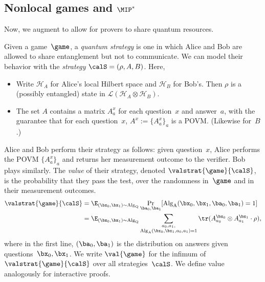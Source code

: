 \subsection{Nonlocal games and $\MIP^*$}

Now, we augment 
to allow for provers to share quantum resources.

\begin{definition}
Given a game~$\game$, a \emph{quantum strategy}
is one in which Alice and Bob are allowed to share entanglement but not to communicate.
We can model their behavior with the \emph{strategy} $\calS= (\rho, A, B)$.
Here,
\begin{itemize}
\itemsep -.5pt
\item[$\circ$] Write $\mathcal{H}_A$ for Alice's local Hilbert space and $\mathcal{H}_B$ for Bob's.
		Then $\rho$ is a (possibly entangled) state in $\mathcal{L}(\mathcal{H}_A \otimes \mathcal{H}_B)$.
\item[$\circ$] The set $A$ contains a matrix $A_a^x$ for each question~$x$ and answer~$a$,
		with the guarantee that for each question~$x$, $A^x := \{A_a^x\}_a$ is a POVM. (Likewise for~$B$.)
\end{itemize} 
Alice and Bob perform their strategy as follows:
given question~$x$, Alice performs the POVM $\{A_a^x\}_a$ and returns her measurement outcome to the verifier.
Bob plays similarly.
The \emph{value} of their strategy, denoted $\valstrat{\game}{\calS}$, is the probability that they pass the test,
over the randomness in~$\game$ and in their measurement outcomes.
\begin{align*}
\valstrat{\game}{\calS}
&= \E_{(\bx_0, \bx_1) \sim \mathrm{Alg}_{\mathrm{Q}}} \Pr_{\ba_0, \ba_1}[\mathrm{Alg}_{\mathrm{A}}(\bx_0, \bx_1, \ba_0, \ba_1) = 1]\\
&= \E_{(\bx_0, \bx_1) \sim \mathrm{Alg}_{\mathrm{Q}}} \sum_{\substack{a_0, a_1,\\\mathrm{Alg}_{\mathrm{A}}(\bx_0, \bx_1, a_0, a_1) = 1}}
	\tr(A_{a_0}^{\bx_0} \otimes A_{a_1}^{\bx_1} \cdot \rho),
\end{align*}
where in the first line, $(\ba_0, \ba_1)$ is the distribution on answers given questions~$\bx_0, \bx_1$.
We write $\val{\game}$ for the infimum of $\valstrat{\game}{\calS}$ over all strategies~$\calS$.
We define value analogously for interactive proofs.


\end{definition}
